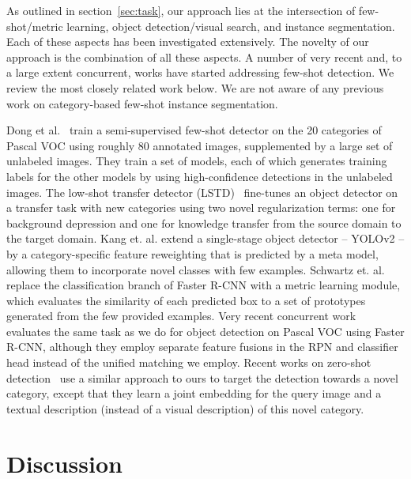 \documentclass{article}
\begin{document}
As outlined in section~\ref{sec:task}, our approach lies at the intersection of few-shot/metric learning, object detection/visual search, and instance segmentation. Each of these aspects has been investigated extensively. The novelty of our approach is the combination of all these aspects. A number of very recent and, to a large extent concurrent, works have started addressing few-shot detection. We review the most closely related work below. We are not aware of any previous work on category-based few-shot instance segmentation.

Dong et al.~\cite{Dong2018} train a semi-supervised few-shot detector on the 20 categories of Pascal VOC using roughly 80 annotated images, supplemented by a large set of unlabeled images. They train a set of models, each of which generates training labels for the other models by using high-confidence detections in the unlabeled images.
The low-shot transfer detector (LSTD)~\cite{Chen2018} fine-tunes an object detector on a transfer task with new categories using two novel regularization terms: one for background depression and one for knowledge transfer from the source domain to the target domain.
Kang et. al. \cite{kang2018few} extend a single-stage object detector -- YOLOv2 \cite{Redmon2017} -- by a category-specific feature reweighting that is predicted by a meta model, allowing them to incorporate novel classes with few examples.
Schwartz et. al. \cite{Schwartz2018a} replace the classification branch of Faster R-CNN with a metric learning module, which evaluates the similarity of each predicted box to a set of prototypes generated from the few provided examples. 
Very recent concurrent work~\cite{Zhang2019} evaluates the same task as we do for object detection on Pascal VOC using Faster R-CNN, although they employ separate feature fusions in the RPN and classifier head instead of the unified matching we employ.
Recent works on zero-shot detection~\cite{Bansal2018, Rahman2018, Demirel2018, zhu2019} use a similar approach to ours to target the detection towards a novel category, except that they learn a joint embedding for the query image and a textual description (instead of a visual description) of this novel category.




\section{Discussion}
\label{sec:discussion}
\end{document}
